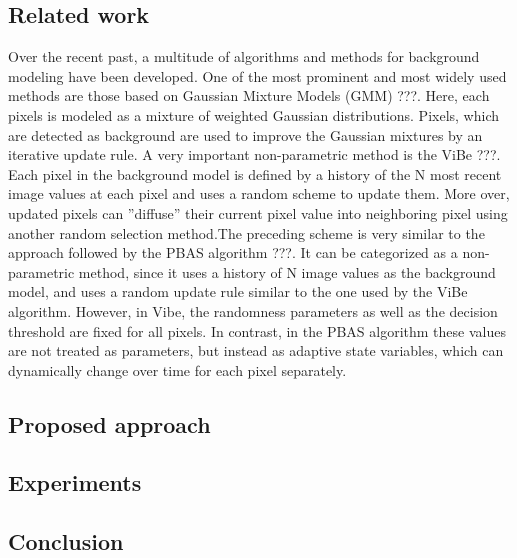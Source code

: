 \subsection*{Related work}
Over the recent past, a multitude of algorithms and methods for background modeling have been developed.
One of the most prominent and most widely used methods are those based on Gaussian Mixture Models (GMM)
???. Here, each pixels is modeled as a mixture of weighted Gaussian distributions. Pixels, which are detected as background are used to improve the Gaussian mixtures by an iterative update rule. A very important non-parametric method is the ViBe ???. Each pixel in the background model is defined by a history of the N most recent image values at each pixel and uses a random scheme to update them. More over, updated pixels can ”diffuse” their current pixel value into neighboring pixel using another random selection method.The preceding scheme is very similar to the approach followed by the PBAS algorithm ???. It can be categorized as a non-parametric method, since it  uses a history of N image values as the background model, and uses a random update rule similar to the one used by the ViBe algorithm. However, in Vibe, the randomness parameters as well as the decision threshold are fixed for all pixels. In contrast, in the PBAS algorithm these values are not treated as parameters, but instead as adaptive state variables, which can dynamically change over time for each pixel separately.


\subsection*{Proposed approach}


\subsection*{Experiments}


\subsection*{Conclusion}

